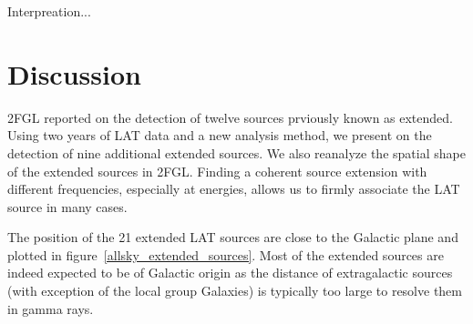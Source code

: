 \documentclass[12pt,preprint]{aastex}
\newcommand{\tev}{\text{TeV}\xspace}
\begin{document}








% 

\begin{shaded}
Interpreation...
\end{shaded}


\section{Discussion}

2FGL reported on the detection of twelve sources
prviously known as extended. Using
two years of LAT data and a new analysis method, we present on 
the detection of nine additional extended sources. We also reanalyze
the spatial shape of the extended sources in 2FGL.  Finding a coherent
source extension with different frequencies, especially at \tev energies,
allows us to firmly associate the LAT source in many cases.

The position of the 21 extended LAT sources are close to the Galactic
plane and plotted in figure~\ref{allsky_extended_sources}.  Most of the
extended sources are indeed expected to be of Galactic origin as the
distance of extragalactic sources (with exception of the local group
Galaxies) is typically too large to resolve them in gamma rays.
\end{document}
